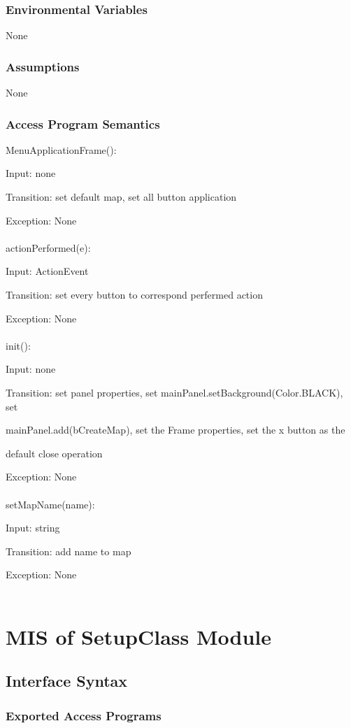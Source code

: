\documentclass[12,english]{article}
\begin{document}
		\subsubsection{Environmental Variables}
		None
		\subsubsection{Assumptions}
        None

		\subsubsection{Access Program Semantics}
		MenuApplicationFrame():
		
		Input: none
		
		Transition: set default map, set all button application
		
		Exception: None\\
		\\
		actionPerformed(e):
		
		Input: ActionEvent
		
		Transition: set every button to correspond perfermed action
		
		Exception: None\\
		\\	
		init():
		
		Input: none
		
		Transition: set panel properties, set mainPanel.setBackground(Color.BLACK), set 
		
		mainPanel.add(bCreateMap), set the Frame properties, set the x button as the 
		
		default close operation
		
		Exception: None\\
		\\
		setMapName(name):
		
		Input: string
		
		Transition: add name to map
		
		Exception: None\\
		\\
\section{MIS of SetupClass Module}
	\subsection{Interface Syntax}
		\subsubsection{Exported Access Programs}
		
\end{document}

